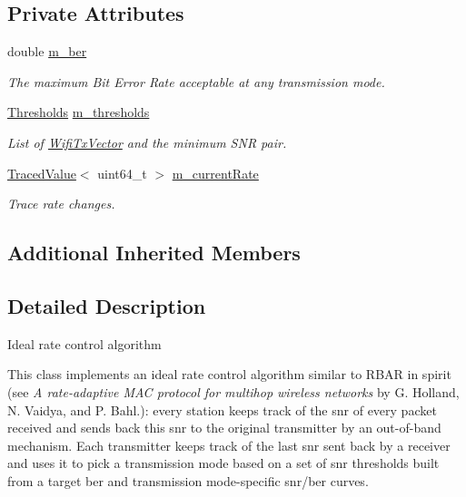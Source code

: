 \subsection*{Private Attributes}
\begin{DoxyCompactItemize}
\item 
double \hyperlink{classns3_1_1IdealWifiManager_a470ced4d78876560eaffb1d96cb2a1d9}{m\+\_\+ber}
\begin{DoxyCompactList}\small\item\em The maximum Bit Error Rate acceptable at any transmission mode. \end{DoxyCompactList}\item 
\hyperlink{classns3_1_1IdealWifiManager_ae4c6d6e6edd816faeb30a2f010eec7d7}{Thresholds} \hyperlink{classns3_1_1IdealWifiManager_add5cf767e7cc6a6d86da48d7be2ed2c9}{m\+\_\+thresholds}
\begin{DoxyCompactList}\small\item\em List of \hyperlink{classns3_1_1WifiTxVector}{Wifi\+Tx\+Vector} and the minimum S\+NR pair. \end{DoxyCompactList}\item 
\hyperlink{classns3_1_1TracedValue}{Traced\+Value}$<$ uint64\+\_\+t $>$ \hyperlink{classns3_1_1IdealWifiManager_ace233bd5a507e354ee1eac6c77b3944b}{m\+\_\+current\+Rate}
\begin{DoxyCompactList}\small\item\em Trace rate changes. \end{DoxyCompactList}\end{DoxyCompactItemize}
\subsection*{Additional Inherited Members}


\subsection{Detailed Description}
Ideal rate control algorithm

This class implements an \textquotesingle{}ideal\textquotesingle{} rate control algorithm similar to R\+B\+AR in spirit (see {\itshape A rate-\/adaptive M\+AC protocol for multihop wireless networks} by G. Holland, N. Vaidya, and P. Bahl.)\+: every station keeps track of the snr of every packet received and sends back this snr to the original transmitter by an out-\/of-\/band mechanism. Each transmitter keeps track of the last snr sent back by a receiver and uses it to pick a transmission mode based on a set of snr thresholds built from a target ber and transmission mode-\/specific snr/ber curves. 

